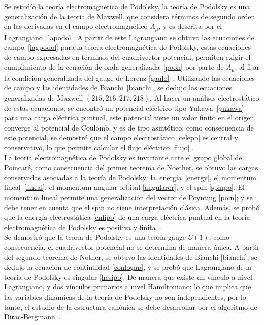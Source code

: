 \documentclass[a4paper,12pt]{article}
\begin{document}
Se estudío la teoría electromagnética de Podolsky, la teoría de Podolsky es una generalización de la teoría de Maxwell, que considera términos de segundo orden en las derivadas en el \mbox{campo} electromagnético $A_\mu$, y es descrita por el \mbox{Lagrangiano \eqref{lapodol}.} A partir de este \mbox{Lagrangiano} se obtuvo las ecuaciones de \mbox{campo \eqref{lagpodol}} para la teoría \mbox{electromagnética} de \mbox{Podolsky}, estas ecuaciones de campo expresadas en \mbox{términos} del cuadrivector \mbox{potencial}, permiten exigir el cumplimiento de la ecuación de onda \mbox{generalizada \eqref{poon}} por parte de $A_\mu$, al fijar la condición generalizada del gauge de Lorenz \mbox{\eqref{gaulo} \cite{podolsky}.} Utilizando las ecuaciones de campo y las \mbox{identidades} de \mbox{Bianchi \eqref{bianchi},} se \mbox{dedujo} las ecuaciones generalizadas de Maxwell $(215, 216, 217, 218)$. Al hacer un \mbox{análisis} \mbox{electrostático} de estas ecuaciones, se encontró un \mbox{potencial} eléctrico tipo \mbox{Yukawa \eqref{yukawa}} para una carga eléctrica puntual, este \mbox{potencial} tiene un valor finito en el origen, converge al potencial de Coulomb, y es de tipo asintótico; como consecuencia de este potencial, se demostró que el campo electrostático \eqref{celepo} es central y conservativo, lo que permite calcular el flujo eléctrico \eqref{flujo} \cite{podolfuerza}. 
\\

La teoría electromagnética de Podolsky es invariante ante el grupo global de Poincaré, como consecuencia del primer teorema de Noether, se obtuvo las cargas conservadas asociadas a la teoría de Podolsky: \mbox{la energía \eqref{energy},} el momentum \mbox{lineal \eqref{lineal}}, el momentum angular orbital \eqref{angularor}, y el spin \eqref{spinpo}. El momentum lineal permite una generalización del vector de Poynting \eqref{poin}; y se debe tener en cuenta que el spin no tiene interpretación clásica. Además, se probó que la energía electrostática \eqref{enfipo} de una carga eléctrica puntual en la teoría electromagnética de Podolsky es positiva y finita \cite{podolsky,podolfuerza}.
\\

Se demostró que la teoría de \mbox{Podolsky} es una teoría gauge $U(1)$, como consecuencia, el cuadrivector potencial no se \mbox{determina} de manera única. A partir del segundo teorema de Nother, se obtuvo las identidades de Bianchi \eqref{bianchi}, se dedujo la ecuación de continuidad \eqref{conlogap}, y se probó que \mbox{Lagrangiano} de la teoría de Podolsky es singular \eqref{hesipo}. De manera que existe un vínculo a nivel Lagrangiano, y dos vínculos primarios a nivel Hamiltoniano; lo que implica que las variables dinámicas de la teoría de Podolsky no son independientes, por lo tanto, el estudio de la estructura canónica se debe desarrollar por el algoritmo de \mbox{Dirac-Bergmann \cite{podolsky}.}
\\
   
\end{document}
